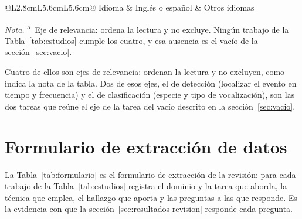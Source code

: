 \begin{table}[htbp]
\begin{threeparttable}
\begin{tabular}{@{}L{2.8cm}L{5.6cm}L{5.6cm}@{}}
        \addlinespace
        Idioma            & Inglés o español                                           & Otros idiomas                                             \\
        \bottomrule
    \end{tabular}
    \begin{tablenotes}[flushleft]
        \footnotesize
        \item \textit{Nota.} \textsuperscript{a}~Eje de relevancia: ordena la
        lectura y no excluye. Ningún trabajo de la Tabla~\ref{tab:estudios} cumple
        los cuatro, y esa ausencia es el vacío de la sección~\ref{sec:vacio}.
    \end{tablenotes}
    \end{threeparttable}
\end{table}

Cuatro de ellos son ejes de relevancia: ordenan la lectura y no excluyen, como
indica la nota de la tabla. Dos de esos ejes, el de detección (localizar el evento
en tiempo y frecuencia) y el de clasificación (especie y tipo de vocalización),
son las dos tareas que reúne el eje de la tarea del vacío descrito en la
sección~\ref{sec:vacio}.

\section{Formulario de extracción de datos}
\label{sec:formulario}

La Tabla~\ref{tab:formulario} es el formulario de extracción de la revisión: para
cada trabajo de la Tabla~\ref{tab:estudios} registra el dominio y la tarea que
aborda, la técnica que emplea, el hallazgo que aporta y las preguntas a las que
responde. Es la evidencia con que la sección~\ref{sec:resultados-revision}
responde cada pregunta.

